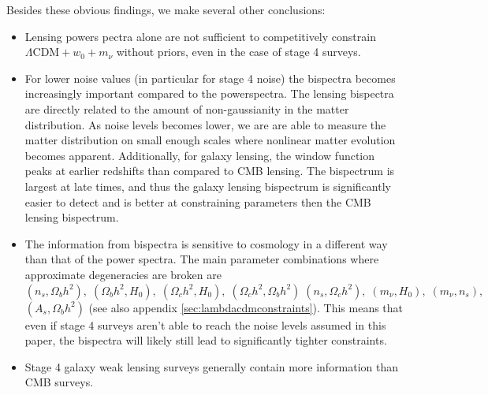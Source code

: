 \documentclass[11pt]{article} %
\begin{document}
Besides these obvious findings, we make several other conclusions:
\begin{itemize}
    \item Lensing powers pectra alone are not sufficient to competitively constrain $\Lambda\mathrm{CDM} + w_0 + m_\nu$ without priors, even in the case of stage 4 surveys.

    \item For lower noise values (in particular for stage 4 noise) the bispectra becomes increasingly important compared to the powerspectra. The lensing bispectra are directly related to the amount of non-gaussianity in the matter distribution. As noise levels becomes lower, we are are able to measure the matter distribution on small enough scales where nonlinear matter evolution becomes apparent. Additionally, for galaxy lensing, the window function peaks at earlier redshifts than compared to CMB lensing. The bispectrum is largest at late times, and thus the galaxy lensing bispectrum is significantly easier to detect and is better at constraining parameters then the CMB lensing bispectrum.

    \item The information from bispectra is sensitive to cosmology in a different way than that of the power spectra. The main parameter combinations where approximate degeneracies are broken are $(n_s,\Omega_b h^2),\;(\Omega_b h^2,H_0),\;(\Omega_c h^2,H_0),\;(\Omega_c h^2,\Omega_b h^2)\;(n_s,\Omega_c h^2),\;(m_\nu,H_0),\;(m_\nu,n_s),$ $(A_s,\Omega_b h^2)$ (see also appendix \ref{sec:lambdacdmconstraints}). This means that even if stage 4 surveys aren't able to reach the noise levels assumed in this paper, the bispectra will likely still lead to significantly tighter constraints.

    \item Stage 4 galaxy weak lensing surveys generally contain more information than CMB surveys. 
\end{itemize}
\end{document}
